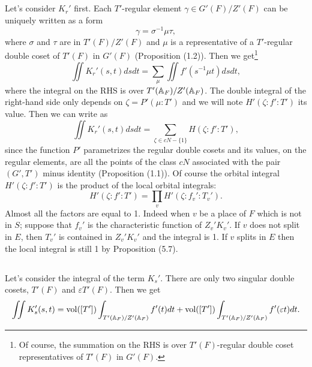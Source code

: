 \subsection{}
Let's consider $K_r'$ first. 
Each $T'$-regular element $\gamma \in G'(F)/Z'(F)$ can be uniquely written as
a form 
\begin{equation}
    \gamma = \sigma^{-1} \mu \tau,
\end{equation} 
where $\sigma$ and $\tau$ are in $T'(F)/Z'(F)$ and $\mu$ is a representative of a $T'$-regular double coset of $T'(F)$ in $G'(F)$ (Proposition (1.2)).
Then we get\footnote{Of course, the summation on the RHS is over $T'(F)$-regular double coset representatives of $T'(F)$ in $G'(F)$.}
\begin{equation}
    \iint K_r'(s, t)dsdt = \sum_{\mu} \iint f'(s^{-1} \mu t) ds dt,
\end{equation}
where the integral on the RHS is over $T'(\mathbb{A}_F) / Z'(\mathbb{A}_F)$.
The double integral of the right-hand side only depends on $\zeta=P'(\mu:T')$ and we will note $H'(\zeta:f':T')$ its value.
Then we can write as
\begin{equation}
    \iint K_r'(s, t)dsdt = \sum_{\zeta \in cN - \{1\}} H(\zeta: f': T'),
\end{equation}
since the function $P'$ parametrizes the regular double cosets and its values, on the regular elements, 
are all the points of the class $cN$ associated with the pair $(G', T')$ minus identity (Proposition (1.1)). 
Of course the orbital integral $H'(\zeta:f':T')$ is the product of the local orbital integrals:
\begin{equation}
    H'(\zeta:f':T') = \prod_v H'(\zeta:f_v':T_v').
\end{equation}
Almost all the factors are equal to 1.
Indeed when $v$ be a place of $F$ which is not in $S$; suppose that $f_v'$ is the characteristic function of $Z_v' K_v'$.
If $v$ does not split in $E$, then $T_v'$ is contained in $Z_v' K_v'$ and the integral is 1.
If $v$ splits in $E$ then the local integral is still 1 by Proposition (5.7).


\subsection{}
Let's consider the integral of the term $K_s'$.
There are only two singular double cosets, $T'(F)$ and $\varepsilon T'(F)$.
Then we get
\begin{equation}
    \iint K_s'(s, t) = \mathrm{vol}([T']) \int_{T'(\mathbb{A}_F)/Z'(\mathbb{A}_F)} f'(t)dt + \mathrm{vol}([T']) \int_{T'(\mathbb{A}_F)/Z'(\mathbb{A}_F)} f'(\varepsilon t) dt.
\end{equation}


